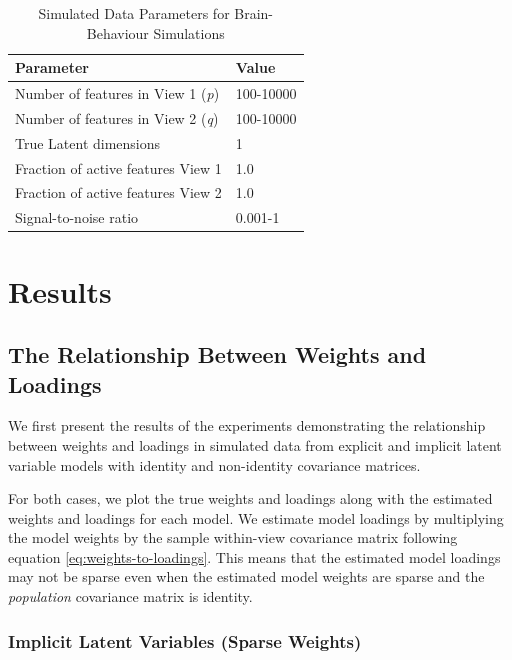 \begin{table}
    \centering
    \caption{Simulated Data Parameters for Brain-Behaviour Simulations}
    \begin{tabular}{| l | l |}
        \hline
        \textbf{Parameter}                        & \textbf{Value}                               \\
        \hline
        Number of features in View 1 (\textit{p}) & 100-10000 \\
        Number of features in View 2 (\textit{q}) & 100-10000 \\
        True Latent dimensions                    & 1                                            \\
        Fraction of active features View 1            & 1.0                                          \\
        Fraction of active features View 2            & 1.0                                          \\
        Signal-to-noise ratio                    & 0.001-1 \\
        \hline
    \end{tabular}\label{tab:simulated-data-parameters-bb}
\end{table}

\section{Results}

\subsection{The Relationship Between Weights and Loadings}

We first present the results of the experiments demonstrating the relationship between weights and \gls{loadings} in simulated data from explicit and implicit latent variable models with identity and non-identity covariance matrices.

For both cases, we plot the true weights and loadings along with the estimated weights and loadings for each model.
We estimate model loadings by multiplying the model weights by the sample within-view covariance matrix following equation \ref{eq:weights-to-loadings}.
This means that the estimated model loadings may not be sparse even when the estimated model weights are sparse and the \textit{population} covariance matrix is identity.

\subsubsection{Implicit Latent Variables (Sparse Weights)}

